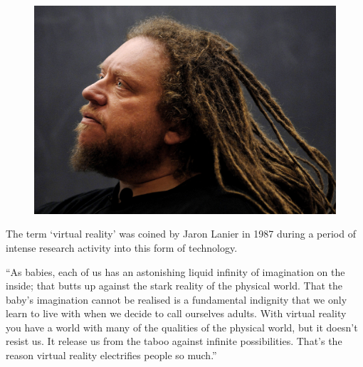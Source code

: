 \begin{frame}
	\begin{figure}
		\includegraphics[scale=0.3]{assets/lanier.jpg}
	\end{figure}
	The term `virtual reality' was coined by Jaron Lanier in 1987 during a period of intense research activity into this form of technology.
	
\end{frame}

\begin{frame}
	``As babies, each of us has an astonishing liquid infinity of imagination on the inside; that butts up against the stark reality of the physical world. That the baby's imagination cannot be realised is a fundamental indignity that we only learn to live with when we decide to call ourselves adults. With virtual reality you have a world with many of the qualities of the physical world, but it doesn't resist us. It release us from the taboo against infinite possibilities. That's the reason virtual reality electrifies people so much.''

\end{frame}



